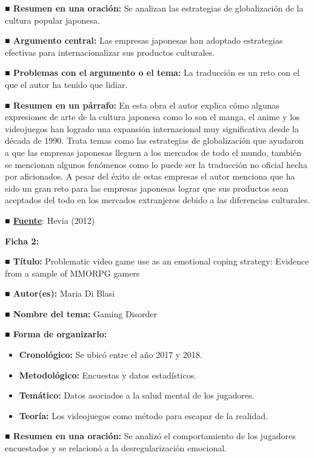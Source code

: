 \documentclass[
  letterpaper,
  DIV=11,
  numbers=noendperiod]{scrreprt}
\begin{document}
\textbf{■ Resumen en una oración:} Se analizan las estrategias de
globalización de la cultura popular japonesa.

\textbf{■ Argumento central:} Las empresas japonesas han adoptado
estrategias efectivas para internacionalizar sus productos culturales.

\textbf{■ Problemas con el argumento o el tema:} La traducción es un
reto con el que el autor ha tenido que lidiar.

\textbf{■ Resumen en un párrafo:} En esta obra el autor explica cómo
algunas expresiones de arte de la cultura japonesa como lo son el manga,
el anime y los videojuegos han logrado una expansión internacional muy
significativa desde la década de 1990. Trata temas como las estrategias
de globalización que ayudaron a que las empresas japonesas lleguen a los
mercados de todo el mundo, también se mencionan algunos fenómenos como
lo puede ser la traducción no oficial hecha por aficionados. A pesar del
éxito de estas empresas el autor menciona que ha sido un gran reto para
las empresas japonesas lograr que sus productos sean aceptados del todo
en los mercados extranjeros debido a las diferencias culturales.

\textbf{■
\href{https://funderetica.org/wp-content/uploads/2017/01/Cuaderno-7-web-def.pdf}{Fuente}}:
Hevia (2012)

\textbf{Ficha 2:}

\textbf{■ Título:} Problematic video game use as an emotional coping
strategy: Evidence from a sample of MMORPG gamers

\textbf{■ Autor(es):} Maria Di Blasi

\textbf{■ Nombre del tema:} Gaming Disorder

\textbf{■ Forma de organizarlo:}

\begin{itemize}
\item
  \textbf{Cronológico:} Se ubicó entre el año 2017 y 2018.
\item
  \textbf{Metodológico:} Encuestas y datos estadísticos.
\item
  \textbf{Temático:} Datos asociados a la salud mental de los jugadores.
\item
  \textbf{Teoría:} Los videojuegos como método para escapar de la
  realidad.
\end{itemize}

\textbf{■ Resumen en una oración:} Se analizó el comportamiento de los
jugadores encuestados y se relacionó a la desregularización emocional.
\end{document}
